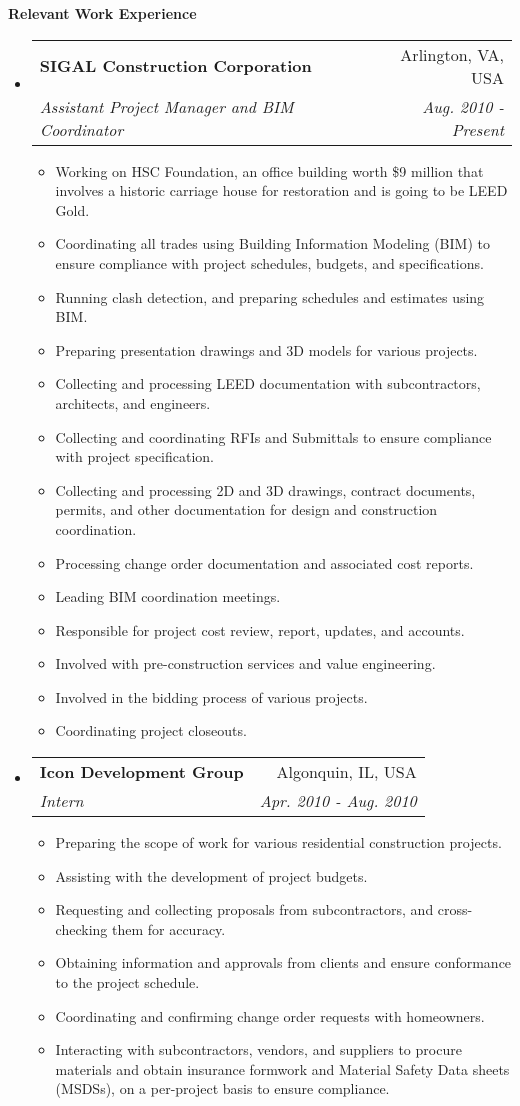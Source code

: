 \documentclass[letterpaper,10pt]{article}
\makeatletter
\newcommand{\resitem}[1]{\item #1}
\newcommand{\resheading}[1]{{\large \colorbox{mygrey}{\vspace{0.6in} \begin{minipage}{\textwidth}{\textbf{#1 \vphantom{p\^{E}}}}\end{minipage}}}}
\newcommand{\ressubheading}[4]{
  \begin{tabular*}{7in}{l@{\extracolsep{\fill}}r}
    \textbf{#1} & #2 \\
    \textit{#3} & \textit{#4} \\
\end{tabular*}}
\makeatother
\begin{document}
\resheading{Relevant Work Experience}
\begin{itemize}

\item
  \ressubheading{SIGAL Construction Corporation}{Arlington, VA, USA}{Assistant Project Manager and BIM Coordinator}{Aug. 2010 - Present}
  \begin{itemize}
    \resitem{Working on HSC Foundation, an office building worth \$9 million that involves a historic carriage house for restoration and is going to be LEED Gold.}
    \resitem{Coordinating all trades using Building Information Modeling (BIM) to ensure compliance with project schedules, budgets, and specifications.}
    \resitem{Running clash detection, and preparing schedules and estimates using BIM.}
    \resitem{Preparing presentation drawings and 3D models for various projects.}
    \resitem{Collecting and processing LEED documentation with subcontractors, architects, and engineers.}
    \resitem{Collecting and coordinating RFIs and Submittals to ensure compliance with project specification.}
    \resitem{Collecting and processing 2D and 3D drawings, contract documents, permits, and other documentation for design and construction coordination.}
    \resitem{Processing change order documentation and associated cost reports.}
    \resitem{Leading BIM coordination meetings.}
    \resitem{Responsible for project cost review, report, updates, and accounts.}
    \resitem{Involved with pre-construction services and value engineering.}
    \resitem{Involved in the bidding process of various projects.}
    \resitem{Coordinating project closeouts.}
  \end{itemize}
\item
  \ressubheading{Icon Development Group}{Algonquin, IL, USA}{Intern}{Apr. 2010 - Aug. 2010}
  \begin{itemize}
    \resitem{Preparing the scope of work for various residential construction projects.}
    \resitem{Assisting with the development of project budgets.}
    \resitem{Requesting and collecting proposals from subcontractors, and cross-checking them for accuracy.}
    \resitem{Obtaining information and approvals from clients and ensure conformance to the project schedule.}
    \resitem{Coordinating and confirming change order requests with homeowners.}
    \resitem{Interacting with subcontractors, vendors, and suppliers to procure materials and obtain insurance formwork and Material Safety Data sheets (MSDSs), on a per-project basis to ensure compliance.}


\end{itemize}
\end{itemize}
\end{document}

